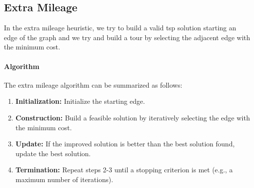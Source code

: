 \documentclass{article}
\begin{document}
\subsection{Extra Mileage}
In the extra mileage heuristic, we try to build a valid tsp solution starting an edge of the graph and we try and build a tour by selecting the adjacent edge with the minimum cost.

\paragraph{Algorithm}
The extra mileage algorithm can be summarized as follows:
\begin{enumerate}
	\item \textbf{Initialization:} Initialize the starting edge.
	\item \textbf{Construction:} Build a feasible solution by iteratively selecting the edge with the minimum cost.
	\item \textbf{Update:} If the improved solution is better than the best solution found, update the best solution.
	\item \textbf{Termination:} Repeat steps 2-3 until a stopping criterion is met (e.g., a maximum number of iterations).
\end{enumerate}
\end{document}
